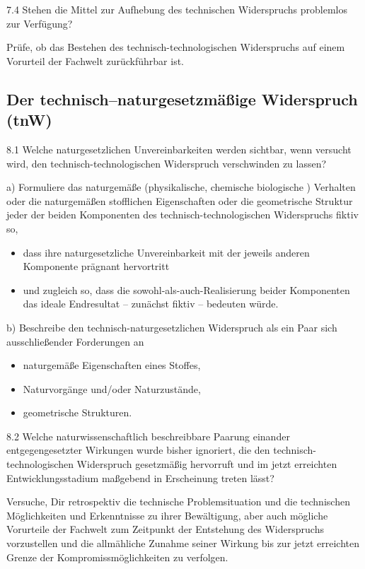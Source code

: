 \documentclass[12pt,a4paper]{article}
\begin{document}
7.4 Stehen die Mittel zur Aufhebung des technischen Widerspruchs problemlos zur
Verfügung?

Prüfe, ob das Bestehen des technisch-technologischen Widerspruchs auf einem
Vorurteil der Fachwelt zurückführbar ist.

\subsection{Der technisch–naturgesetzmäßige Widerspruch (tnW)}

8.1 Welche naturgesetzlichen Unvereinbarkeiten werden sichtbar, wenn versucht
wird, den technisch-technologischen Widerspruch verschwinden zu lassen?

a) Formuliere das naturgemäße (physikalische, chemische biologische ) Verhalten
oder die naturgemäßen stofflichen Eigenschaften oder die geometrische Struktur
jeder der beiden Komponenten des technisch-technologischen Widerspruchs fiktiv
so,
\begin{itemize}
  \item dass ihre naturgesetzliche Unvereinbarkeit mit der jeweils anderen
    Komponente prägnant hervortritt
  \item und zugleich so, dass die sowohl-als-auch-Realisierung beider
    Komponenten das ideale Endresultat – zunächst fiktiv – bedeuten würde.
\end{itemize}
b) Beschreibe den technisch-naturgesetzlichen Widerspruch als ein Paar sich
ausschließender Forderungen an
\begin{itemize}
\item naturgemäße Eigenschaften eines Stoffes,
\item Naturvorgänge und/oder Naturzustände,
\item geometrische Strukturen.
\end{itemize}

8.2 Welche naturwissenschaftlich beschreibbare Paarung einander
entgegengesetzter Wirkungen wurde bisher ignoriert, die den
technisch-technologischen Widerspruch gesetzmäßig hervorruft und im jetzt
erreichten Entwicklungsstadium maßgebend in Erscheinung treten lässt?

Versuche, Dir retrospektiv die technische Problemsituation und die technischen
Möglichkeiten und Erkenntnisse zu ihrer Bewältigung, aber auch mögliche
Vorurteile der Fachwelt zum Zeitpunkt der Entstehung des Widerspruchs
vorzustellen und die allmähliche Zunahme seiner Wirkung bis zur jetzt
erreichten Grenze der Kompromissmöglichkeiten zu verfolgen.
\end{document}
